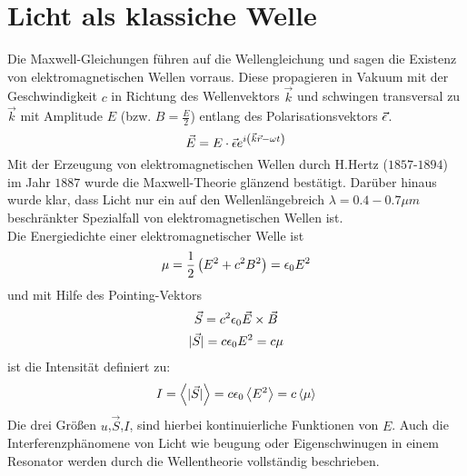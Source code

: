 \section{Licht als klassiche Welle} %
\label{sec:Licht_als_klassiche_Welle}
Die Maxwell-Gleichungen führen auf die Wellengleichung und sagen die Existenz
von elektromagnetischen Wellen vorraus. Diese propagieren in Vakuum mit der
Geschwindigkeit $c$ in Richtung des Wellenvektors $\vec{k}$ und schwingen
transversal zu $\vec{k}$ mit Amplitude $E$ (bzw. $B= \frac{E}{2}$) entlang des
Polarisationsvektors $\vec{\epsilon}$.
\begin{equation*}
    \vec{E} = E \cdot \vec{\epsilon} e^{i \left( \vec{k} \vec{r} - \omega t \right) }
\end{equation*}
Mit der Erzeugung von elektromagnetischen Wellen durch H.Hertz ($1857$-$1894$)
im Jahr $1887$ wurde die Maxwell-Theorie glänzend bestätigt. Darüber hinaus
wurde klar, dass Licht nur ein auf den Wellenlängebreich $\lambda = 0.4 - 0.7
\mu m$ beschränkter Spezialfall von elektromagnetischen Wellen ist.
\\
Die Energiedichte einer elektromagnetischer Welle ist
\begin{equation*}
    \mu = \frac{1}{2} \left( E^2 + c^2 B^2 \right)  = \epsilon_0 E^2
\end{equation*}
und mit Hilfe des Pointing-Vektors
\begin{gather*}
    \vec{S} = c^2 \epsilon_0 \vec{E} \times \vec{B} \\
    \lvert \vec{S} \rvert = c \epsilon_0 E^2 = c \mu
\end{gather*}
ist die Intensität definiert zu:
\begin{equation*}
    I = \left\langle \lvert \vec{S} \rvert \right\rangle
    = c \epsilon_0 \left\langle E^2 \right\rangle
    = c \left\langle \mu \right\rangle
\end{equation*}
Die drei Größen $u$,$\vec{S}$,$I$, sind hierbei kontinuierliche Funktionen von
$E$. Auch die Interferenzphänomene von Licht wie beugung oder Eigenschwinugen
in einem Resonator werden durch die Wellentheorie vollständig beschrieben.

